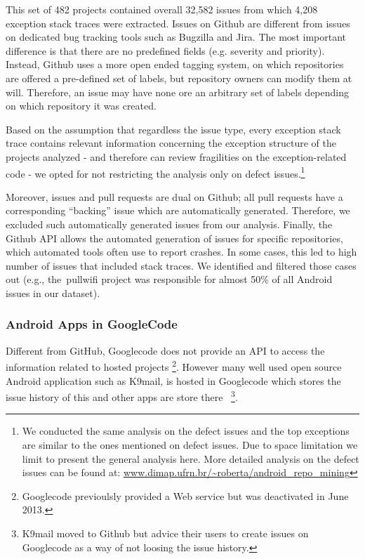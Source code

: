 \documentclass[conference]{IEEEtran}
\begin{document}
This set of 482 projects contained overall 32,582 issues from which 4,208 exception stack traces 
were extracted. Issues on Github are different from issues on dedicated bug tracking tools such as 
Bugzilla and Jira. The most important difference is that there are no predefined fields
  (e.g. severity and priority). Instead, Github uses a more open ended tagging system, on which
repositories are offered a pre-defined set of labels, but repository owners can modify 
them at will. Therefore, an issue may have none ore an arbitrary set of labels depending 
on which repository it was created. 

Based on the assumption that regardless the issue type, every exception stack
trace contains relevant information concerning the exception structure of the
projects analyzed - and therefore can review fragilities on the exception-related code -  
we opted for not restricting the analysis only on defect
issues.\footnote{We conducted the same analysis on the defect issues and the top
exceptions are similar to the ones mentioned on defect issues. Due to space
limitation we limit to present the general analysis here. More detailed analysis
on the defect issues can be found at:
\url{www.dimap.ufrn.br/~roberta/android_repo_mining}}

Moreover, issues and pull requests are dual on Github; all pull requests have a corresponding 
``backing'' issue which are automatically generated. Therefore, we excluded such automatically generated
issues from our analysis. Finally, the Github API allows the automated
generation of issues for specific repositories, which automated tools often use
to report crashes. In some cases, this led to high number of issues that
included stack traces. We identified and filtered those cases out (e.g.,
the~\textsf{pullwifi} project was responsible for almost 50\% of all Android issues in our dataset).

\subsubsection{Android Apps in GoogleCode}

Different from GitHub, Googlecode does not provide an API to access the information related
 to hosted projects \footnote{Googlecode previoulsly provided a Web service but was deactivated in June 2013.}.
However many well used open source Android application such as K9mail, is hosted in Googlecode which stores
the issue history of this and other apps are store there ~\footnote{K9mail moved to Github but advice their 
users to create issues on Googlecode as a way of not loosing the issue history.}.
\end{document}
